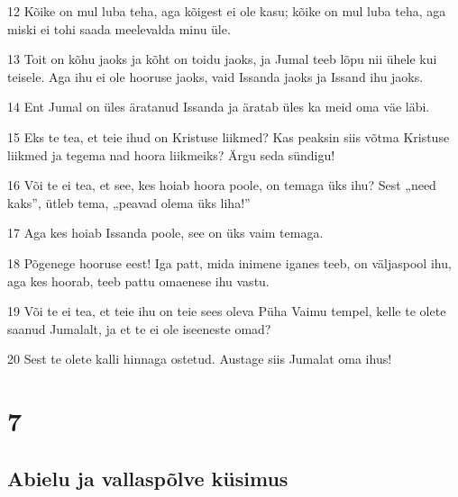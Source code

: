 \par 12 Kõike on mul luba teha, aga kõigest ei ole kasu; kõike on mul luba teha, aga miski ei tohi saada meelevalda minu üle.
\par 13 Toit on kõhu jaoks ja kõht on toidu jaoks, ja Jumal teeb lõpu nii ühele kui teisele. Aga ihu ei ole hooruse jaoks, vaid Issanda jaoks ja Issand ihu jaoks.
\par 14 Ent Jumal on üles äratanud Issanda ja äratab üles ka meid oma väe läbi.
\par 15 Eks te tea, et teie ihud on Kristuse liikmed? Kas peaksin siis võtma Kristuse liikmed ja tegema nad hoora liikmeiks? Ärgu seda sündigu!
\par 16 Või te ei tea, et see, kes hoiab hoora poole, on temaga üks ihu? Sest „need kaks”, ütleb tema, „peavad olema üks liha!”
\par 17 Aga kes hoiab Issanda poole, see on üks vaim temaga.
\par 18 Põgenege hooruse eest! Iga patt, mida inimene iganes teeb, on väljaspool ihu, aga kes hoorab, teeb pattu omaenese ihu vastu.
\par 19 Või te ei tea, et teie ihu on teie sees oleva Püha Vaimu tempel, kelle te olete saanud Jumalalt, ja et te ei ole iseeneste omad?
\par 20 Sest te olete kalli hinnaga ostetud. Austage siis Jumalat oma ihus!


\chapter{7}

\section*{Abielu ja vallaspõlve küsimus}

